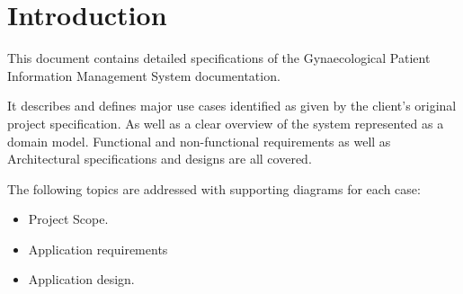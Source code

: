 \section{Introduction}

This document contains detailed specifications of the Gynaecological Patient Information
Management System documentation. \bigskip

It describes and defines major use cases identified as given by the client's original project specification. As well as a clear overview of the system represented as a domain model. Functional and non-functional requirements as well as Architectural specifications and designs are all covered. \bigskip

The following topics are addressed with supporting diagrams for each case:

\begin{itemize}
	\item Project Scope.
	\item Application requirements
	\item Application design.
\end{itemize}